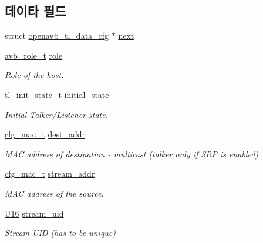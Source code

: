 \subsection*{데이타 필드}
\begin{DoxyCompactItemize}
\item 
struct \hyperlink{structopenavb__tl__data__cfg}{openavb\+\_\+tl\+\_\+data\+\_\+cfg} $\ast$ \hyperlink{structopenavb__tl__data__cfg_a46f524e45db4fe7e0158366e4e8e6b5a}{next}
\item 
\hyperlink{openavb__types__base__pub_8h_a590fdc081b8544206aabd58e32a6f6a2}{avb\+\_\+role\+\_\+t} \hyperlink{structopenavb__tl__data__cfg_a172ec388c6d270261a61a789b78dff45}{role}
\begin{DoxyCompactList}\small\item\em Role of the host. \end{DoxyCompactList}\item 
\hyperlink{build_2sdk__eavb_2openavb__tl__pub_8h_a3db837d528f98176f3e7225a53d0abaa}{tl\+\_\+init\+\_\+state\+\_\+t} \hyperlink{structopenavb__tl__data__cfg_af00cb7d534b8d163f482aacb7bf9661d}{initial\+\_\+state}
\begin{DoxyCompactList}\small\item\em Initial Talker/\+Listener state. \end{DoxyCompactList}\item 
\hyperlink{structcfg__mac__t}{cfg\+\_\+mac\+\_\+t} \hyperlink{structopenavb__tl__data__cfg_adafdd018fad617237267247e6680f87a}{dest\+\_\+addr}
\begin{DoxyCompactList}\small\item\em M\+AC address of destination -\/ multicast (talker only if S\+RP is enabled) \end{DoxyCompactList}\item 
\hyperlink{structcfg__mac__t}{cfg\+\_\+mac\+\_\+t} \hyperlink{structopenavb__tl__data__cfg_aad445ea3a27a465a885b5d56648ad282}{stream\+\_\+addr}
\begin{DoxyCompactList}\small\item\em M\+AC address of the source. \end{DoxyCompactList}\item 
\hyperlink{openavb__types__base__pub_8h_a0a0a322d5fa4a546d293a77ba8b4a71f}{U16} \hyperlink{structopenavb__tl__data__cfg_a511b2a26fe61b945ced1dd0bab9f2d1b}{stream\+\_\+uid}
\begin{DoxyCompactList}\small\item\em Stream U\+ID (has to be unique) \end{DoxyCompactList}\item 

\end{DoxyCompactItemize}

